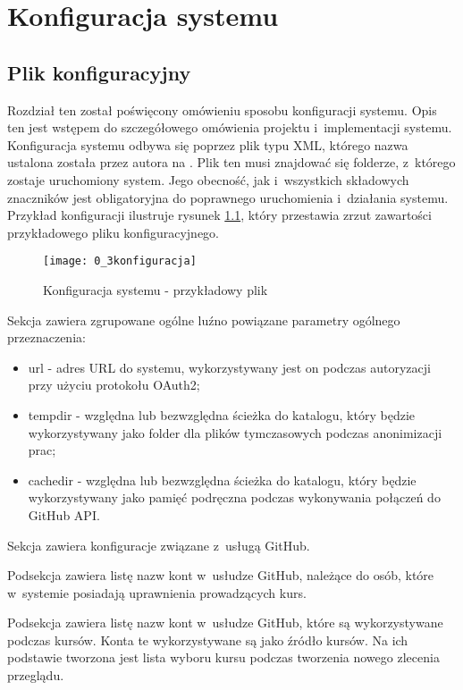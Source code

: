 \chapter{Konfiguracja systemu}

\section{Plik konfiguracyjny}
Rozdział ten został poświęcony omówieniu sposobu konfiguracji systemu. Opis ten jest wstępem do szczegółowego omówienia projektu i~implementacji systemu. Konfiguracja systemu odbywa się poprzez plik typu XML, którego nazwa ustalona została przez autora na . Plik ten musi znajdować się folderze, z~którego zostaje uruchomiony system. Jego obecność, jak i~wszystkich składowych znaczników jest obligatoryjna do poprawnego uruchomienia i~działania systemu. Przykład konfiguracji ilustruje rysunek \ref{obr03}, który przestawia zrzut zawartości przykładowego pliku konfiguracyjnego.

\begin{figure}[!h]
\centering
    \texttt{[image: 0\_3konfiguracja]}
    \caption{Konfiguracja systemu - przykładowy plik}
    \label{obr03}
\end{figure}

\clearpage

Sekcja  zawiera zgrupowane ogólne luźno powiązane parametry ogólnego przeznaczenia:
\begin{itemize}
    \item url - adres URL do systemu, wykorzystywany jest on podczas autoryzacji przy użyciu protokołu OAuth2;
    \item tempdir - względna lub bezwzględna ścieżka do katalogu, który będzie wykorzystywany jako folder dla plików tymczasowych podczas anonimizacji prac;
    \item cachedir - względna lub bezwzględna ścieżka do katalogu, który będzie wykorzystywany jako pamięć podręczna podczas wykonywania połączeń do GitHub API.
\end{itemize}

\medskip
Sekcja  zawiera konfiguracje związane z~usługą GitHub.

Podsekcja  zawiera listę nazw kont w~usłudze GitHub, należące do osób, które w~systemie posiadają uprawnienia prowadzących kurs.

Podsekcja  zawiera listę nazw kont w~usłudze GitHub, które są wykorzystywane podczas kursów. Konta te wykorzystywane są jako źródło kursów. Na ich podstawie tworzona jest lista wyboru kursu podczas tworzenia nowego zlecenia przeglądu.

